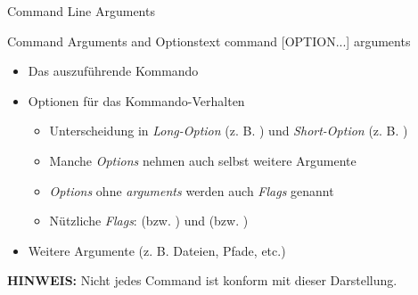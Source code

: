 \documentclass{setbeamer}
\begin{document}
\begin{frame}[fragile]{Command Line Arguments}
    \begin{TUMCodeBlock}{Command Arguments and Options}{text}
        command [OPTION...] arguments
    \end{TUMCodeBlock}

    \vspace{0.3cm}

    \begin{itemize}
        \item {}\textemdash Das auszuführende Kommando

        \item {}\textemdash Optionen für das Kommando-Verhalten
        \begin{itemize}
            \item Unterscheidung in \emph{Long-Option} (z. B. ) und \emph{Short-Option} (z. B. )
            \item Manche \emph{Options} nehmen auch selbst weitere Argumente
            \item \emph{Options} ohne \emph{arguments} werden auch \emph{Flags} genannt
            \item Nützliche \emph{Flags}:  (bzw. ) und  (bzw. )
        \end{itemize}

        \item {}\textemdash Weitere Argumente (z. B. Dateien, Pfade, etc.)
    \end{itemize}

    \pause
    \vspace{0.3cm}

    \textbf{HINWEIS:} Nicht jedes Command ist konform mit dieser Darstellung.
\end{frame}
\end{document}
